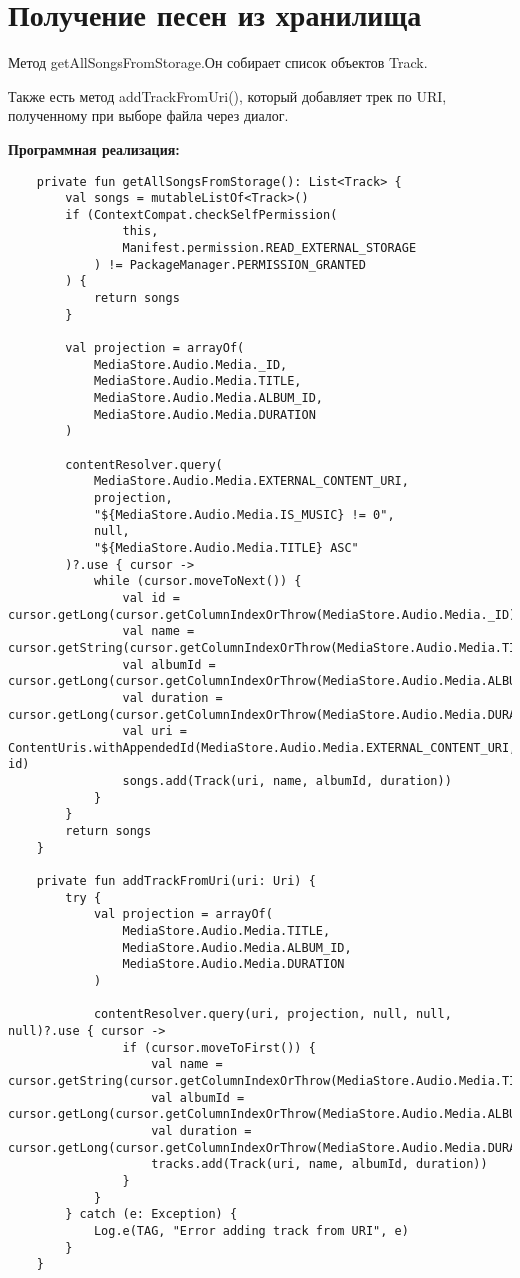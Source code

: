 \section{Получение песен из хранилища}

Метод getAllSongsFromStorage.Он собирает список объектов Track.

Также есть метод addTrackFromUri(), который добавляет трек по URI, полученному при выборе файла через диалог.

\textbf{Программная реализация:}
\begin{verbatim}
	private fun getAllSongsFromStorage(): List<Track> {
        val songs = mutableListOf<Track>()
        if (ContextCompat.checkSelfPermission(
                this,
                Manifest.permission.READ_EXTERNAL_STORAGE
            ) != PackageManager.PERMISSION_GRANTED
        ) {
            return songs
        }

        val projection = arrayOf(
            MediaStore.Audio.Media._ID,
            MediaStore.Audio.Media.TITLE,
            MediaStore.Audio.Media.ALBUM_ID,
            MediaStore.Audio.Media.DURATION
        )

        contentResolver.query(
            MediaStore.Audio.Media.EXTERNAL_CONTENT_URI,
            projection,
            "${MediaStore.Audio.Media.IS_MUSIC} != 0",
            null,
            "${MediaStore.Audio.Media.TITLE} ASC"
        )?.use { cursor ->
            while (cursor.moveToNext()) {
                val id = cursor.getLong(cursor.getColumnIndexOrThrow(MediaStore.Audio.Media._ID))
                val name = cursor.getString(cursor.getColumnIndexOrThrow(MediaStore.Audio.Media.TITLE))
                val albumId = cursor.getLong(cursor.getColumnIndexOrThrow(MediaStore.Audio.Media.ALBUM_ID))
                val duration = cursor.getLong(cursor.getColumnIndexOrThrow(MediaStore.Audio.Media.DURATION))
                val uri = ContentUris.withAppendedId(MediaStore.Audio.Media.EXTERNAL_CONTENT_URI, id)
                songs.add(Track(uri, name, albumId, duration))
            }
        }
        return songs
    }

	private fun addTrackFromUri(uri: Uri) {
        try {
            val projection = arrayOf(
                MediaStore.Audio.Media.TITLE,
                MediaStore.Audio.Media.ALBUM_ID,
                MediaStore.Audio.Media.DURATION
            )

            contentResolver.query(uri, projection, null, null, null)?.use { cursor ->
                if (cursor.moveToFirst()) {
                    val name = cursor.getString(cursor.getColumnIndexOrThrow(MediaStore.Audio.Media.TITLE))
                    val albumId = cursor.getLong(cursor.getColumnIndexOrThrow(MediaStore.Audio.Media.ALBUM_ID))
                    val duration = cursor.getLong(cursor.getColumnIndexOrThrow(MediaStore.Audio.Media.DURATION))
                    tracks.add(Track(uri, name, albumId, duration))
                }
            }
        } catch (e: Exception) {
            Log.e(TAG, "Error adding track from URI", e)
        }
    }
\end{verbatim}

